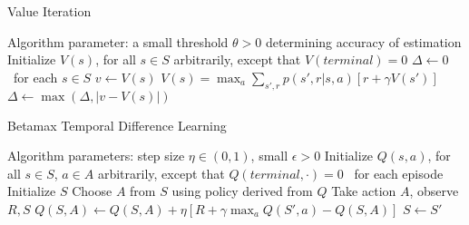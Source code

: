 \documentclass[11pt]{article} %
\begin{document}
\begin{algorithm}
  \caption{Value Iteration}

  \State Algorithm parameter: a small threshold $\theta > 0$ determining accuracy of estimation
  \State Initialize $V(s)$, for all $s \in S$ arbitrarily, except that $V(terminal) = 0$
  \State
  \While{$\Delta > \theta$}
    \State $\Delta \leftarrow 0$
    \Loop \ for each $s \in S$
      \State $v \leftarrow V(s)$
      \State $ V(s) = \max_a \sum_{s',r} p(s',r|s,a) \left[ r + \gamma V(s') \right] $
      \State $\Delta \leftarrow \max(\Delta, |v - V(s)|)$
    \EndLoop
  \EndWhile

\end{algorithm}

\begin{algorithm}
  \caption{Betamax Temporal Difference Learning}

  \State Algorithm parameters: step size $\eta \in (0, 1)$, small $\epsilon > 0$
  \State Initialize $Q(s,a)$, for all $s \in S$, $a \in A$ arbitrarily, except that $Q(terminal,\cdot) = 0$
  \State
  \Loop \ for each episode
    \State Initialize $S$
      \State Choose $A$ from $S$ using policy derived from $Q$
      \State Take action $A$, observe $R, S$
      \State $Q(S, A) \leftarrow Q(S, A) + \eta \left[ R + \gamma \max_a Q(S',a) − Q(S, A) \right] $
      \State $S \leftarrow S'$
    \EndWhile
  \EndLoop

\end{algorithm}
\end{document}
